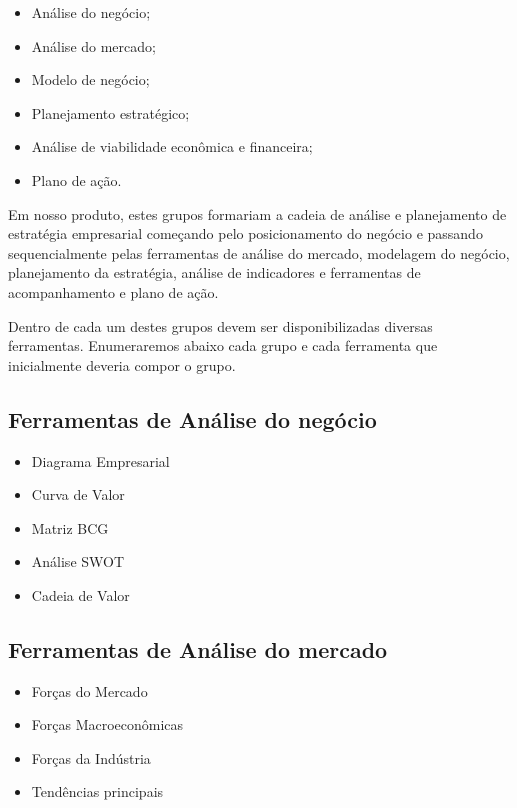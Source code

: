 \documentclass{abnt}
\begin{document}
\begin{itemize}
	\item Análise do negócio;
	\item Análise do mercado;
	\item Modelo de negócio;
	\item Planejamento estratégico;
	\item Análise de viabilidade econômica e financeira;
	\item Plano de ação.
\end{itemize}

Em nosso produto, estes grupos formariam a cadeia de análise e planejamento de
estratégia empresarial começando pelo posicionamento do negócio e passando
sequencialmente pelas ferramentas de análise do mercado, modelagem do negócio,
planejamento da estratégia, análise de indicadores e ferramentas de
acompanhamento e plano de ação.

Dentro de cada um destes grupos devem ser disponibilizadas diversas ferramentas.
Enumeraremos abaixo cada grupo e cada ferramenta que inicialmente deveria compor
o grupo.

\subsection{Ferramentas de Análise do negócio} \label{ferramentas}

\begin{itemize}
	\item Diagrama Empresarial \cite{DiagramaEmpresarial}
	\item Curva de Valor \cite{CurvaValor}
	\item Matriz BCG \cite{BCG}
	\item Análise SWOT \cite{SWOT}
	\item Cadeia de Valor \cite{CadeiaDeValor}
\end{itemize}

\subsection{Ferramentas de Análise do mercado}

\begin{itemize}
	\item Forças do Mercado \cite{Porter}
	\item Forças Macroeconômicas \cite{Porter}
	\item Forças da Indústria \cite{Porter}
	\item Tendências principais \cite{Porter}
\end{itemize}
\end{document}
